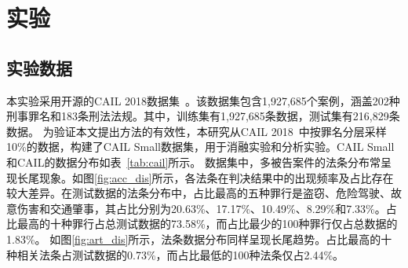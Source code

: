 \section{\heiti 实验}

\subsection{\heiti 实验数据}


本实验采用开源的CAIL 2018数据集~\cite{xiao2018cail2018largescalelegaldataset}。该数据集包含1,927,685个案例，涵盖202种刑事罪名和183条刑法法规。其中，训练集有1,927,685条数据，测试集有216,829条数据。
为验证本文提出方法的有效性，本研究从CAIL 2018~\cite{xiao2018cail2018largescalelegaldataset}中按罪名分层采样10\%的数据，构建了CAIL Small数据集，用于消融实验和分析实验。CAIL Small和CAIL的数据分布如表~\ref{tab:cail}所示。
数据集中，多被告案件的法条分布常呈现长尾现象。如图\ref{fig:acc_dis}所示，各法条在判决结果中的出现频率及占比存在较大差异。在测试数据的法条分布中，占比最高的五种罪行是盗窃、危险驾驶、故意伤害和交通肇事，其占比分别为20.63\%、17.17\%、10.49\%、8.29\%和7.33\%。占比最高的十种罪行占总测试数据的73.58\%，而占比最少的100种罪行仅占总数据的1.83\%。
如图\ref{fig:art_dis}所示，法条数据分布同样呈现长尾趋势。占比最高的十种相关法条占测试数据的0.73\%，而占比最低的100种法条仅占2.44\%。

